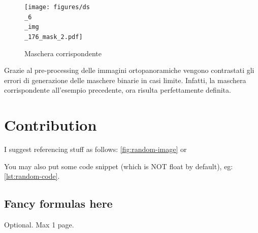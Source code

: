 \documentclass[12pt,a4paper,openright,twoside]{book}
\begin{document}
\begin{figure}[H]
	\centering
	\texttt{[image: figures/ds\\\_6\\\_img\\\_176\_mask\_2.pdf]}
    	\caption{Maschera corrispondente}
	\label{fig:maskLuminosa}
\end{figure}
Grazie al pre-processing delle immagini ortopanoramiche vengono contrastati gli errori di generazione delle maschere binarie in casi limite.
Infatti, la maschera corrispondente all'esempio precedente, ora risulta perfettamente definita.

\chapter{Contribution}
I suggest referencing stuff as follows: \cref{fig:random-image} or 

You may also put some code snippet (which is NOT float by default), eg: \cref{lst:random-code}.



\section{Fancy formulas here}


\backmatter

\nocite{*} %




\begin{acknowledgements} %
Optional. Max 1 page.
\end{acknowledgements}
\end{document}
